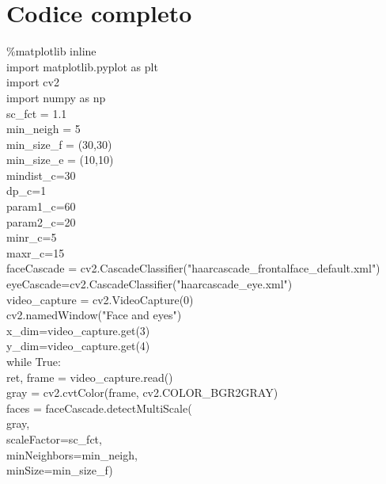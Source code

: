 \documentclass[12pt]{article}
\begin{document}
{\pagebreak  	 					
 
\section{Codice completo}

  \%matplotlib inline \\
  import matplotlib.pyplot as plt\\

  import cv2\\
  import numpy as np\\


  sc\_fct = 1.1             \\
  min\_neigh = 5    \\          
  min\_size\_f = (30,30)      \\
  min\_size\_e = (10,10)     \\ 
  mindist\_c=30     \\         
  dp\_c=1          \\         
  param1\_c=60      \\       
  param2\_c=20       \\      
  minr\_c=5          \\     
  maxr\_c=15        \\      


  faceCascade = cv2.CascadeClassifier("haarcascade\_frontalface\_default.xml")\\
  eyeCascade=cv2.CascadeClassifier("haarcascade\_eye.xml")\\


  video\_capture = cv2.VideoCapture(0)\\
  cv2.namedWindow("Face and eyes")\\

  x\_dim=video\_capture.get(3)\\
  y\_dim=video\_capture.get(4)\\

  while True:\\
    ret, frame = video\_capture.read()\\


  gray = cv2.cvtColor(frame, cv2.COLOR\_BGR2GRAY)\\


  faces = faceCascade.detectMultiScale(       \\
  gray,\\
  scaleFactor=sc\_fct,\\
  minNeighbors=min\_neigh,\\
  minSize=min\_size\_f)\\

}
\end{document}
